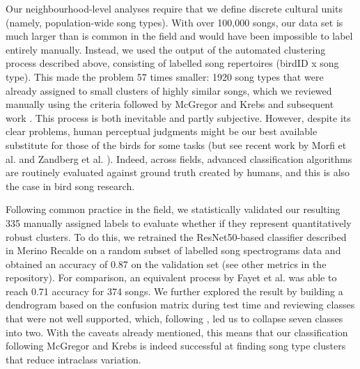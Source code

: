 \documentclass[9pt, onecolumn, twoside, lineno]{gsajnl}
\begin{document}
Our neighbourhood-level analyses require that we define discrete cultural units (namely, population-wide song types). With over 100,000 songs, our data set is much larger than is common in the field and would have been impossible to label entirely manually. Instead, we used the output of the automated clustering process described above, consisting of labelled song repertoires (birdID x song type). This made the problem 57 times smaller: 1920 song types that were already assigned to small clusters of highly similar songs, which we reviewed manually using the criteria followed by McGregor and Krebs \autocite{mcgregor1982b, mcgregor1982, mcgregor1981} and subsequent work \autocite{baker1987, falls1982, fayet2014, hutfluss2022}.
This process is both inevitable and partly subjective. However, despite its clear problems, human perceptual judgments might be our best available substitute for those of the birds for some tasks (but see recent work by Morfi et al. \autocite{morfi2021} and  Zandberg et al. \autocite{zandberg2022}). Indeed, across fields, advanced classification algorithms are routinely evaluated against ground truth created by humans, and this is also the case in bird song research.

Following common practice in the field, we statistically validated our resulting 335 manually assigned labels to evaluate whether if they represent quantitatively robust clusters. To do this, we retrained the ResNet50-based classifier described in Merino Recalde \autocite{merinorecalde2023} on a random subset of labelled song spectrograms data and obtained an accuracy of 0.87 on the validation set (see other metrics in the repository). For comparison, an equivalent process by Fayet et al. \autocite{fayet2014} was able to reach 0.71 accuracy for 374 songs. We further explored the result by building a dendrogram based on the confusion matrix during test time and reviewing classes that were not well supported, which, following  \autocite{fayet2014}, led us to collapse seven classes into two. With the caveats already mentioned, this means that our classification following McGregor and Krebs \autocite{mcgregor1982b} is indeed successful at finding song type clusters that reduce intraclass variation.
\end{document}
